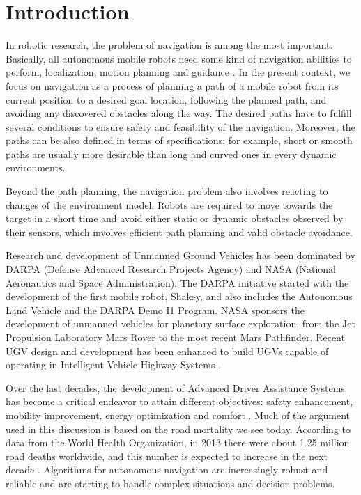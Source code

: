\chapter{Introduction}
In robotic research, the problem of navigation is among the most important. Basically, all autonomous mobile robots need some kind of navigation abilities to perform, localization, motion planning and guidance \cite{Skoda:Thesis:2016}. In the present context, we focus on navigation as a process of planning a path of a mobile robot from its current position to a desired goal location, following the planned path, and avoiding any discovered obstacles along the way. The desired paths have to fulfill several conditions to ensure safety and feasibility of the navigation. Moreover, the paths can be also defined in terms of specifications; for example, short or smooth paths are usually more desirable than long and curved ones in every dynamic environments. 

Beyond the path planning, the navigation problem also involves reacting to changes of the environment model. Robots are required to move towards the target in a short time and avoid either static or dynamic obstacles observed by their sensors, which involves efficient path planning and valid obstacle avoidance. 

Research and development of Unmanned Ground Vehicles has been dominated by DARPA (Defense Advanced Research Projects Agency) and NASA (National Aeronautics and Space Administration). The DARPA initiative started with the development of the first mobile robot, Shakey, and also includes the Autonomous Land Vehicle and the DARPA Demo I1 Program. NASA sponsors the development of unmanned vehicles for planetary surface exploration, from the Jet Propulsion Laboratory Mars Rover to the most recent Mars Pathfinder. Recent UGV design and development has been enhanced to build UGVs capable of operating in Intelligent Vehicle Highway Systems \cite{Bai2015}.

Over the last decades, the development of Advanced Driver Assistance Systems has become a critical endeavor to attain different objectives: safety enhancement, mobility improvement, energy optimization and comfort \cite{Gruyer2017}. Much of the argument used in this discussion is based on the road mortality we see today. According to data from the World Health Organization, in 2013 there were about 1.25 million road deaths worldwide, and this number is expected to increase in the next decade \cite{world2015global}. Algorithms for autonomous navigation are increasingly robust and reliable and are starting to handle complex situations and decision problems.

